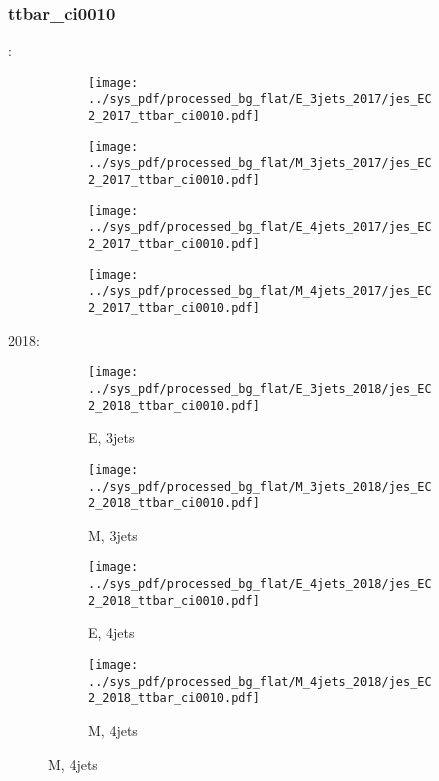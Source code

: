 \documentclass{beamer}
\begin{document}
\begin{frame}
\frametitle{ttbar_ci0010}
\fontsize{5}{1}:
\begin{figure}
\centering
\begin{subfigure}[b]{0.24\textwidth}
\texttt{[image: ../sys\_pdf/processed\_bg\_flat/E\_3jets\_2017/jes\_EC2\_2017\_ttbar\_ci0010.pdf]}
\end{subfigure}
\begin{subfigure}[b]{0.24\textwidth}
\texttt{[image: ../sys\_pdf/processed\_bg\_flat/M\_3jets\_2017/jes\_EC2\_2017\_ttbar\_ci0010.pdf]}
\end{subfigure}
\begin{subfigure}[b]{0.24\textwidth}
\texttt{[image: ../sys\_pdf/processed\_bg\_flat/E\_4jets\_2017/jes\_EC2\_2017\_ttbar\_ci0010.pdf]}
\end{subfigure}
\begin{subfigure}[b]{0.24\textwidth}
\texttt{[image: ../sys\_pdf/processed\_bg\_flat/M\_4jets\_2017/jes\_EC2\_2017\_ttbar\_ci0010.pdf]}
\end{subfigure}
\end{figure}
2018:
\begin{figure}
\centering
\begin{subfigure}[b]{0.24\textwidth}
\texttt{[image: ../sys\_pdf/processed\_bg\_flat/E\_3jets\_2018/jes\_EC2\_2018\_ttbar\_ci0010.pdf]}
\captionsetup{font=tiny}
\caption{E, 3jets}
\end{subfigure}
\begin{subfigure}[b]{0.24\textwidth}
\texttt{[image: ../sys\_pdf/processed\_bg\_flat/M\_3jets\_2018/jes\_EC2\_2018\_ttbar\_ci0010.pdf]}
\captionsetup{font=tiny}
\caption{M, 3jets}
\end{subfigure}
\begin{subfigure}[b]{0.24\textwidth}
\texttt{[image: ../sys\_pdf/processed\_bg\_flat/E\_4jets\_2018/jes\_EC2\_2018\_ttbar\_ci0010.pdf]}
\captionsetup{font=tiny}
\caption{E, 4jets}
\end{subfigure}
\begin{subfigure}[b]{0.24\textwidth}
\texttt{[image: ../sys\_pdf/processed\_bg\_flat/M\_4jets\_2018/jes\_EC2\_2018\_ttbar\_ci0010.pdf]}
\captionsetup{font=tiny}
\caption{M, 4jets}
\end{subfigure}
\end{figure}
\end{frame}
\end{document}
